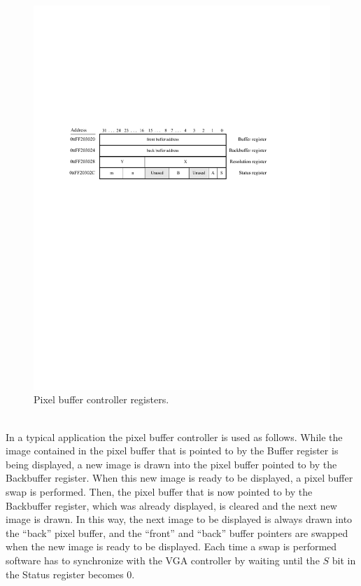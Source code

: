 \documentclass[epsfig,10pt,fullpage]{article}
\begin{document}
\begin{figure}[h!]
   \begin{center}
       \includegraphics{figures/fig_video_port.pdf}
   \end{center}
   \caption{Pixel buffer controller registers.}
	\label{fig:pixel_ctrl}
\end{figure}

~\\
In a typical application the pixel buffer controller is used as follows. While the image
contained in the pixel buffer that is pointed to by the Buffer register is being displayed, 
a new image is drawn into the pixel buffer pointed to by the Backbuffer register. When this new
image is ready to be displayed, a pixel buffer swap is performed. Then, the pixel buffer 
that is now pointed to by the Backbuffer register, which was already displayed, is cleared and 
the next new image is drawn. In this way, the next image to be displayed is always drawn into
the ``back'' pixel buffer, and the ``front'' and ``back'' buffer pointers are swapped when 
the new image is ready to be displayed. Each time a swap is performed software has to 
synchronize with the VGA controller by waiting until the $S$ bit in the Status register becomes 0.
\end{document}
